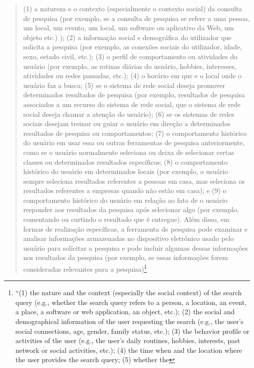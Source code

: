 \begin{quote}
(1) a natureza e o contexto (especialmente o contexto social) da
consulta de pesquisa (por exemplo, se a consulta de pesquisa se refere a
uma pessoa, um local, um evento, um local, um software ou aplicativo da
Web, um objeto etc.) ); (2) a informação social e demográfica do
utilizador que solicita a pesquisa (por exemplo, as conexões sociais do
utilizador, idade, sexo, estado civil, etc.); (3) o perfil de
comportamento ou atividades do usuário (por exemplo, as rotinas diárias
do usuário, hobbies, interesses, atividades ou redes passadas, etc.);
(4) o horário em que e o local onde o usuário faz a busca; (5) se o
sistema de rede social deseja promover determinados resultados de
pesquisa (por exemplo, resultados de pesquisa associados a um recurso do
sistema de rede social, que o sistema de rede social deseja chamar a
atenção do usuário); (6) se os sistemas de redes sociais desejam treinar
ou guiar o usuário em direção a determinados resultados de pesquisa ou
comportamentos; (7) o comportamento histórico do usuário em usar essa ou
outras ferramentas de pesquisa anteriormente, como se o usuário
normalmente seleciona ou deixa de selecionar certas classes ou
determinados resultados específicos; (8) o comportamento histórico do
usuário em determinados locais (por exemplo, o usuário sempre seleciona
resultados referentes a pessoas em casa, mas seleciona os resultados
referentes a empresas quando não estão em casa); e (9) o comportamento
histórico do usuário em relação ao fato de o usuário responder aos
resultados da pesquisa após selecionar algo (por exemplo, comentando ou
curtindo o resultado que é entregue). Além disso, em formas de
realização específicas, a ferramenta de pesquisa pode examinar e
analisar informações armazenadas no dispositivo eletrônico usado pelo
usuário para solicitar a pesquisa e pode incluir algumas dessas
informações nos resultados da pesquisa (por exemplo, se essas
informações forem consideradas relevantes para a pesquisa)\footnote{``(1)
  the nature and the context (especially the social context) of the
  search query (e.g., whether the search query refers to a person, a
  location, an event, a place, a software or web application, an object,
  etc.); (2) the social and demographical information of the user
  requesting the search (e.g., the user's social connections, age,
  gender, family status, etc.); (3) the behavior profile or activities
  of the user (e.g., the user's daily routines, hobbies, interests, past
  network or social activities, etc.); (4) the time when and the
  location where the user provides the search query; (5) whether the
}
\end{quote}
